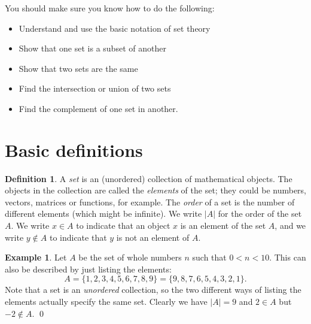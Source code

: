 \documentclass[a4paper]{book}
\newcommand{\PURPLE}[1]{{\color{purple}#1}}
\renewcommand{\:}{\colon}
\newcommand{\DEFN}[1]{\PURPLE{\emph{#1}}}
\theoremstyle{definition}
\newtheorem{definition}[theorem]{Definition}
\newtheorem{example}[theorem]{Example}
\begin{document}

You should make sure you know how to do the following:
\begin{itemize}
 \item Understand and use the basic notation of set theory
 \item Show that one set is a subset of another
 \item Show that two sets are the same
 \item Find the intersection or union of two sets
 \item Find the complement of one set in another.
\end{itemize}

\section{Basic definitions}
\label{sec-sets-basic}

\begin{definition}
 A \DEFN{set} is an (unordered) collection of mathematical objects.
 The objects in the collection are called the \DEFN{elements} of the
 set; they could be numbers, vectors, matrices or functions, for
 example.  The \DEFN{order} of a set is the number of different
 elements (which might be infinite).  We write $|A|$ for the order of
 the set $A$.  We write $x\in A$ to indicate that an object $x$ is an
 element of the set $A$, and we write $y\not\in A$ to indicate that
 $y$ is not an element of $A$.
\end{definition}

\begin{example}
 Let $A$ be the set of whole numbers $n$ such that $0<n<10$.  This can
 also be described by just listing the elements:
 \[ A = \{1,2,3,4,5,6,7,8,9\} = \{9,8,7,6,5,4,3,2,1\}. \]
 Note that a set is an \DEFN{unordered} collection, so the two
 different ways of listing the elements actually specify the same set.
 Clearly we have $|A|=9$ and $2\in A$ but $-2\not\in A$. \qed
\end{example}
\end{document}
